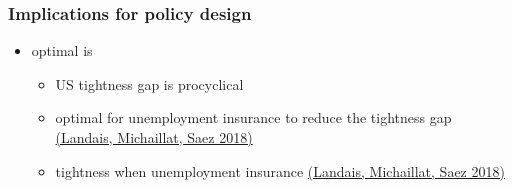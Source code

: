 \documentclass[12pt,xcolor={dvipsnames},hyperref={pdftex,pdfpagemode=UseNone,hidelinks,pdfdisplaydoctitle=true},usepdftitle=false]{beamer}
\begin{document}
\begin{frame}
\frametitle{Implications for policy design}
\begin{itemize}
\item optimal  is 
\begin{itemize}
\item US tightness gap is procyclical	
\item optimal for unemployment insurance to reduce the tightness gap \href{https://www.pascalmichaillat.org/4.html}{ (Landais, Michaillat, Saez 2018)}
\item tightness \up when unemployment insurance \up \href{https://www.pascalmichaillat.org/5.html}{ (Landais, Michaillat, Saez 2018)}
\end{itemize}
\end{itemize}	
\end{frame}
\end{document}
